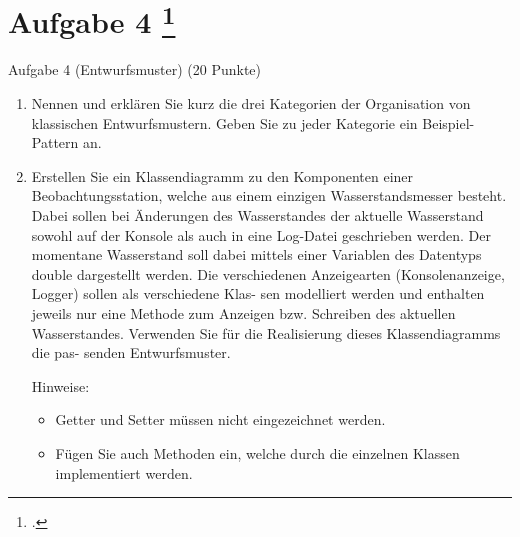 \documentclass{lehramt-informatik-aufgabe}
\begin{document}
\section{Aufgabe 4
\footcite{66116:2021:03}}

Aufgabe 4 (Entwurfsmuster) (20 Punkte)
\begin{enumerate}


\item Nennen und erklären Sie kurz die drei Kategorien der Organisation
von klassischen Entwurfsmustern. Geben Sie zu jeder Kategorie ein
Beispiel-Pattern an.


\item Erstellen Sie ein Klassendiagramm zu den Komponenten einer
Beobachtungsstation, welche aus einem einzigen Wasserstandsmesser
besteht. Dabei sollen bei Änderungen des Wasserstandes der aktuelle
Wasserstand sowohl auf der Konsole als auch in eine Log-Datei
geschrieben werden. Der momentane Wasserstand soll dabei mittels einer
Variablen des Datentyps double dargestellt werden. Die verschiedenen
Anzeigearten (Konsolenanzeige, Logger) sollen als verschiedene Klas- sen
modelliert werden und enthalten jeweils nur eine Methode zum Anzeigen
bzw. Schreiben des aktuellen Wasserstandes. Verwenden Sie für die
Realisierung dieses Klassendiagramms die pas- senden Entwurfsmuster.

Hinweise:

\begin{itemize}
\item Getter und Setter müssen nicht eingezeichnet werden.

\item Fügen Sie auch Methoden ein, welche durch die einzelnen Klassen
implementiert werden.

\end{itemize}
\end{enumerate}
\end{document}
